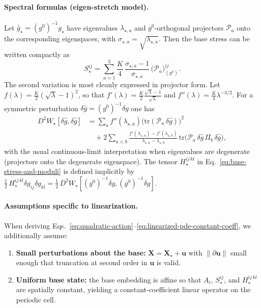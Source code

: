 \paragraph{Spectral formulas (eigen-stretch model).}
Let $\widehat g_\star=(g^0)^{-1}g_\star$ have eigenvalues $\lambda_{\star,a}$ and
$g^0$-orthogonal projectors $\mathcal P_a$ onto the corresponding eigenspaces, with $\sigma_{\star,a}=\sqrt{\lambda_{\star,a}}$.
Then the base stress can be written compactly as
\begin{equation}
  S_\star^{ij}
  =
  \sum_{a=1}^3
  \frac{K}{4}\,\frac{\sigma_{\star,a}-1}{\sigma_{\star,a}}\,
  \big(\mathcal P_a\big)^{ij}_{(g^0)}.
  \label{eq:base-stress-spectral}
\end{equation}
The second variation is most cleanly expressed in projector form. Let
$f(\lambda)=\frac{K}{2}(\sqrt{\lambda}-1)^2$, so that
$f'(\lambda)=\frac{K}{2}\frac{\sqrt{\lambda}-1}{\sqrt{\lambda}}$ and
$f''(\lambda)=\frac{K}{4}\lambda^{-3/2}$.
For a symmetric perturbation $\delta\widehat g=(g^0)^{-1}\delta g$ one has
\begin{align}
  D^2W_\star[\delta\widehat g,\delta\widehat g]
  &=
  \sum_a f''(\lambda_{\star,a})\big(\mathrm{tr}(\mathcal P_a\,\delta \widehat g)\big)^2
  \nonumber\\
  &\quad+
  2\sum_{a<b}
  \frac{f'(\lambda_{\star,a})-f'(\lambda_{\star,b})}{\lambda_{\star,a}-\lambda_{\star,b}}\,
  \mathrm{tr}\big(\mathcal P_a\,\delta \widehat g\,\Pi_b\,\delta \widehat g\big),
  \label{eq:second-variation-spectral}
\end{align}
with the usual continuous-limit interpretation when eigenvalues are degenerate (projectors onto the degenerate eigenspace).
The tensor $H_\star^{ij\,kl}$ in Eq.~\eqref{eq:base-stress-and-moduli} is defined implicitly by
$\tfrac12\,H_\star^{ij\,kl}\delta g_{ij}\delta g_{kl}=\tfrac12\,D^2W_\star[(g^0)^{-1}\delta g,(g^0)^{-1}\delta g]$.

\paragraph{Assumptions specific to linearization.}
When deriving Eqs.~\eqref{eq:quadratic-action}--\eqref{eq:linearized-pde-constant-coeff},
we additionally assume:

\begin{enumerate}
  \item \textbf{Small perturbations about the base:}
  $\mathbf X=\mathbf X_\star+\mathbf u$ with $\|\partial\mathbf u\|$ small enough that
  truncation at second order in $\mathbf u$ is valid.

  \item \textbf{Uniform base state:}
  the base embedding is affine so that $A_i$, $S_\star^{ij}$, and $H_\star^{ij\,kl}$ are spatially constant,
  yielding a constant-coefficient linear operator on the periodic cell.
\end{enumerate}

